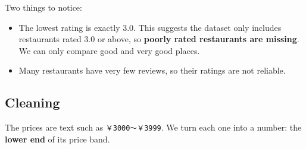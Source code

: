 \documentclass[
]{article}
\providecommand{\tightlist}{%
  \setlength{\itemsep}{0pt}\setlength{\parskip}{0pt}}
\begin{document}
Two things to notice:

\begin{itemize}
\tightlist
\item
  The lowest rating is exactly 3.0. This suggests the dataset only
  includes restaurants rated 3.0 or above, so \textbf{poorly rated
  restaurants are missing}. We can only compare good and very good
  places.
\item
  Many restaurants have very few reviews, so their ratings are not
  reliable.
\end{itemize}

\subsection{Cleaning}\label{cleaning}

The prices are text such as \texttt{￥3000～￥3999}. We turn each one
into a number: the \textbf{lower end} of its price band.
\end{document}
